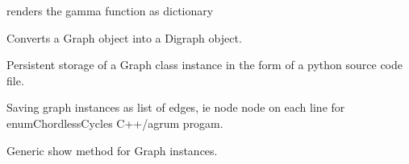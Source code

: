 \documentclass[letterpaper,10pt,english]{sphinxmanual}
\begin{document}
\begin{fulllineitems}
\begin{fulllineitems}
\end{fulllineitems}


\begin{fulllineitems}
\label{techDoc:graphs.Graph.gammaSets}
renders the gamma function as dictionary

\end{fulllineitems}


\begin{fulllineitems}
\label{techDoc:graphs.Graph.graph2Digraph}
Converts a Graph object into a Digraph object.

\end{fulllineitems}


\begin{fulllineitems}
\label{techDoc:graphs.Graph.save}
Persistent storage of a Graph class instance in the form of a python source code file.

\end{fulllineitems}


\begin{fulllineitems}
\label{techDoc:graphs.Graph.saveEdges}
Saving graph instances as list of edges, ie node node on each line
for enumChordlessCycles C++/agrum progam.

\end{fulllineitems}


\begin{fulllineitems}
\label{techDoc:graphs.Graph.showShort}
Generic show method for Graph instances.

\end{fulllineitems}


\end{fulllineitems}

\end{document}
